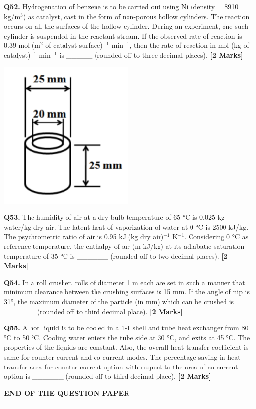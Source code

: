 \documentclass[11pt]{article}
\newcommand{\questionb}[2]{
    \noindent\textbf{Q#2.} #1 \hfill \textbf{[2 Marks]}
}
\begin{document}
\questionb{Hydrogenation of benzene is to be carried out using Ni (density = 8910 kg/m\(^3\)) as catalyst, cast in the form of non-porous hollow cylinders. The reaction occurs on all the surfaces of the hollow cylinder. During an experiment, one such cylinder is suspended in the reactant stream. If the observed rate of reaction is 0.39 mol (m\(^2\) of catalyst surface)\(^{-1}\) min\(^{-1}\), then the rate of reaction in mol (kg of catalyst)\(^{-1}\) min\(^{-1}\) is \_\_\_\_\_ (rounded off to three decimal places).}{52}
\begin{center}
\includegraphics[width=0.5\textwidth]{figures/Q52.png}
\end{center}

\vspace{0.5cm}
\questionb{ The humidity of air at a dry-bulb temperature of 65 °C is 0.025 kg water/kg dry air. The latent heat of vaporization of water at 0 °C is 2500 kJ/kg. The psychrometric ratio of air is 0.95 kJ (kg dry air)\(^{-1}\) K\(^{-1}\). Considering 0 °C as reference temperature, the enthalpy of air (in kJ/kg) at its adiabatic saturation temperature of 35 °C is \_\_\_\_\_\_ (rounded off to two decimal places).}{53}

\vspace{0.5cm}

\questionb{ In a roll crusher, rolls of diameter 1 m each are set in such a manner that minimum clearance between the crushing surfaces is 15 mm. If the angle of nip is 31°, the maximum diameter of the particle (in mm) which can be crushed is \_\_\_\_\_\_ (rounded off to third decimal place).}{54}

\vspace{0.5cm}

\questionb {A hot liquid is to be cooled in a 1-1 shell and tube heat exchanger from 80 °C to 50 °C. Cooling water enters the tube side at 30 °C, and exits at 45 °C. The properties of the liquids are constant. Also, the overall heat transfer coefficient is same for counter-current and co-current modes. The percentage saving in heat transfer area for counter-current option with respect to the area of co-current option is \_\_\_\_\_\_ (rounded off to third decimal place).}{55}

\vspace{5cm}
\begin{center}
\textbf{END OF THE QUESTION PAPER}
\rule{\textwidth}{0.5pt} 
\end{center}
\end{document}
